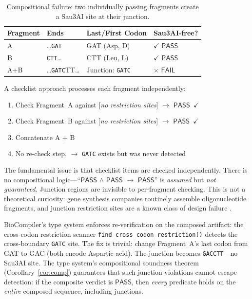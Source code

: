 \documentclass[acmsmall,review,anonymous]{acmart}
\newcommand{\PASS}{\ensuremath{\mathsf{PASS}}\xspace}
\newcommand{\FAIL}{\ensuremath{\mathsf{FAIL}}\xspace}
\begin{document}
\begin{table}[t]
\centering
\caption{Compositional failure: two individually passing fragments
         create a Sau3AI site at their junction.}
\label{tab:junction}
\begin{tabular}{llll}
\toprule
\textbf{Fragment} & \textbf{Ends} & \textbf{Last/First Codon} &
  \textbf{Sau3AI-free?} \\
\midrule
A & \dots\texttt{GAT} & GAT (Asp, D) & $\checkmark$ \PASS \\
B & \texttt{CTT}\dots & CTT (Leu, L) & $\checkmark$ \PASS \\
A+B & \dots\texttt{GATC}TT\dots & Junction: \texttt{GATC} &
  $\times$ \FAIL \\
\bottomrule
\end{tabular}
\end{table}

A checklist approach processes each fragment independently:
\begin{enumerate}[leftmargin=*,itemsep=0pt,topsep=1pt]
\item Check Fragment~A against [\emph{no restriction sites}]
      $\to$ \PASS~$\checkmark$
\item Check Fragment~B against [\emph{no restriction sites}]
      $\to$ \PASS~$\checkmark$
\item Concatenate A $+$ B
\item No re-check step. $\to$ \texttt{GATC} exists but was never
      detected
\end{enumerate}

The fundamental issue is that checklist items are checked
independently.
There is no compositional logic---``\PASS{} $\wedge$ \PASS{}
$\to$ \PASS'' is \emph{assumed} but \emph{not guaranteed}.
Junction regions are invisible to per-fragment checking.
This is not a theoretical curiosity: gene synthesis companies
routinely assemble oligonucleotide fragments, and junction
restriction sites are a known class of design failure
\cite{piret2020dnachisel}.

BioCompiler's type system enforces re-verification on the composed
artifact: the cross-codon restriction scanner
\texttt{find\_cross\_codon\_restriction()} detects the cross-boundary
\texttt{GATC} site.
The fix is trivial: change Fragment~A's last codon from GAT to GAC
(both encode Aspartic acid).
The junction becomes \texttt{GACCTT}---no Sau3AI site.
The type system's compositional soundness theorem
(Corollary~\ref{cor:comp}) guarantees that such junction violations
cannot escape detection: if the composite verdict is \PASS, then
\emph{every} predicate holds on the \emph{entire} composed sequence,
including junctions.
\end{document}
